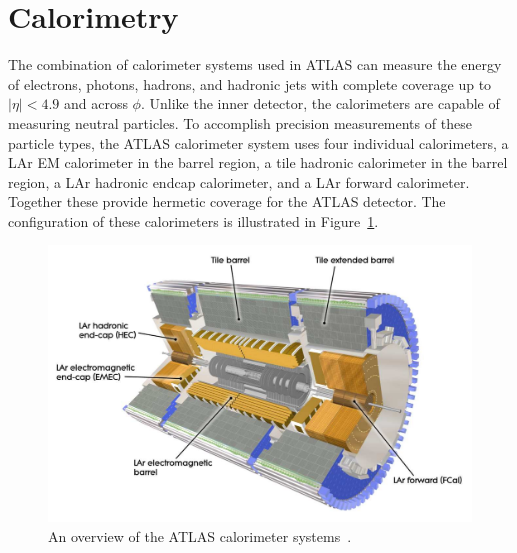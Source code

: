 
\section{Calorimetry}
\label{sec:calorimetry}

The combination of calorimeter systems used in ATLAS can measure the energy of electrons, photons, hadrons, and hadronic jets with complete coverage up to $|\eta| < 4.9$ and across $\phi$.
Unlike the inner detector, the calorimeters are capable of measuring neutral particles.
To accomplish precision measurements of these particle types, the ATLAS calorimeter system uses four individual calorimeters, a \ac{LAr} \acl{EM} calorimeter in the barrel region, a tile hadronic calorimeter in the barrel region, a \ac{LAr} hadronic endcap calorimeter, and a \ac{LAr} forward calorimeter.
Together these provide hermetic coverage for the ATLAS detector.
The configuration of these calorimeters is illustrated in Figure~\ref{fig:calo_overview}. 

\begin{figure}[hbtp]
\includegraphics[width=\fullfig]{figures/calo_overview.pdf}
\caption{An overview of the ATLAS calorimeter systems~\cite{atlas_experiment}.}
\label{fig:calo_overview}
\end{figure}


